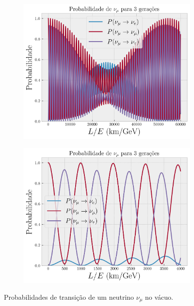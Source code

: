 \documentclass[12pt]{report}
\begin{document}
\begin{figure}[H]
\centering
\begin{subfigure}{.5\textwidth}
  \centering
  \includegraphics[width=.75\linewidth]{fig/3nu-vacuo-mu.png}
  \caption{}
  \label{fig:vacuo-mu}
\end{subfigure}%
\begin{subfigure}{.5\textwidth}
  \centering
  \includegraphics[width=.75\linewidth]{fig/3nu-vacuo-mu_short.png}
  \caption{}
  \label{fig:vacuo-mu_short}
\end{subfigure}
\caption{Probabilidades de transição de um neutrino $\nu_\mu$ no vácuo.}
\label{fig:vacuo_muon}
\end{figure}
\end{document}
